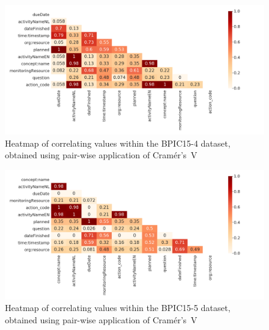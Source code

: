 \begin{figure}[ht!]
\centering
\includegraphics[width=\textwidth]{gfx/bpic2015_4/correlation-heatmap.png}
\caption[Cramér's V heatmap of BPIC15-4]{Heatmap of correlating values within the BPIC15-4 dataset, obtained using pair-wise application of Cramér's~V}
\label{fig:BPIC15-4-correlation-heatmap}
\end{figure}

\begin{figure}[ht!]
\centering
\includegraphics[width=\textwidth]{gfx/bpic2015_5/correlation-heatmap.png}
\caption[Cramér's V heatmap of BPIC15-5]{Heatmap of correlating values within the BPIC15-5 dataset, obtained using pair-wise application of Cramér's~V}
\label{fig:BPIC15-5-correlation-heatmap}
\end{figure}
